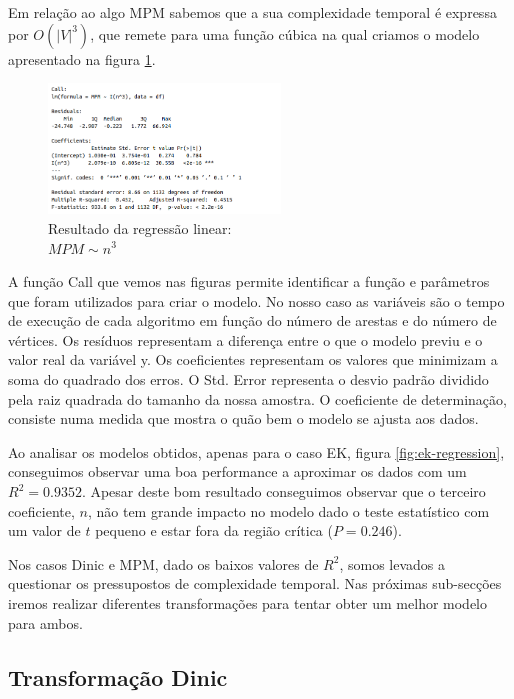 \documentclass{uofa-eng-assignment}
\begin{document}
Em relação ao algo MPM sabemos que a sua complexidade temporal é expressa por $O(|V|^3)$, que remete para uma função cúbica na qual criamos o modelo apresentado na figura \ref{fig:mpm-regression}.

\begin{figure}
    \centering
    \includegraphics[width=0.55\textwidth]{mpm_n^3_lm.png}
    \captionsetup{justification=centering}
    \caption{Resultado da regressão linear: \\$MPM \sim n^3$}
    \label{fig:mpm-regression}
\end{figure}

A função Call que vemos nas figuras permite identificar a função e parâmetros que foram utilizados para criar o modelo. No nosso caso as variáveis são o tempo de execução de cada algoritmo em função do número de arestas e do número de vértices.
Os resíduos representam a diferença entre o que o modelo previu e o valor real da variável y. Os coeficientes representam os valores que minimizam a soma do quadrado dos erros.
O Std. Error representa o desvio padrão dividido pela raiz quadrada do tamanho da nossa amostra.
O coeficiente de determinação, consiste numa medida que mostra o quão bem o modelo se ajusta aos dados.

Ao analisar os modelos obtidos, apenas para o caso EK, figura \ref{fig:ek-regression}, conseguimos observar uma boa performance a aproximar os dados com um $R^2 = 0.9352$. Apesar deste bom resultado conseguimos observar que o terceiro coeficiente, $n$, não tem grande impacto no modelo dado o teste estatístico com um valor de $t$ pequeno e estar fora da região crítica ($P = 0.246$).

Nos casos Dinic e MPM, dado os baixos valores de $R^2$, somos levados a questionar os pressupostos de complexidade temporal. Nas próximas sub-secções iremos realizar diferentes transformações para tentar obter um melhor modelo para ambos.





\WFclear
\newpage
\subsection{Transformação Dinic}
\end{document}
